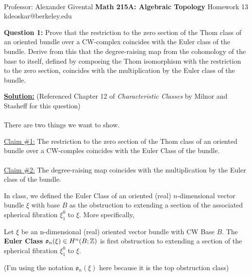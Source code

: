 \documentclass[11pt]{article}
\begin{document}
\thispagestyle{empty}
\bigskip \
\vspace{0.1cm}

\begin{center}
{\fontsize{22}{22} \selectfont Professor: Alexander Givental}
\vskip 16pt
{\fontsize{30}{30} \selectfont \bf \sffamily Math 215A: Algebraic Topology}
\vskip 24pt
{\fontsize{14}{14} \selectfont \rmfamily Homework 13} 
\vskip 6pt
{\fontsize{14}{14} \selectfont \ttfamily kdeoskar@berkeley.edu} 
\vskip 24pt
\end{center}




\begin{bluebox}
  \textbf{Question 1:} Prove that the restriction to the zero section of the Thom class of an oriented bundle over a CW-complex coincides with the Euler class of the bundle. Derive from this that the degree-raising map from the cohomology of the base to itself, defined by composing the Thom isomorphism with the restriction to the zero section, coincides with the multiplication by the Euler class of the bundle.
\end{bluebox}

\vskip 0.5cm
\textbf{\underline{Solution:}} (Referenced Chapter 12 of \textit{Characteristic Classes} by Milnor and Stasheff for this question)
\\
\\
There are two things we want to show.
\begin{dottedbox}
  \underline{Claim \#1:} The restriction to the zero section of the Thom class of an oriented bundle over a CW-comples coincides with the Euler Class of the bundle.
  \\
  \\
  \underline{Claim \#2:} The degree-raising map coincides with the multiplication by the Euler class of the bundle.
\end{dottedbox}

In class, we defined the Euler Class of an oriented (real) $n$-dimensional vector bundle $\xi$ with base $B$ as the obstruction to extending a section of the associated spherical fibration $\xi_1^0$ to $\xi$. More specifically,


\begin{definition}
  Let $\xi$ be an n-dimensional (real) oriented vector bundle with CW Base $B$. The \textbf{Euler Class} $\mathfrak{o}_n(\xi) \in H^n(B; \mathbb{Z})$ is first obstruction to extending a section of the spherical fibration $\xi_1^0$ to $\xi$.
\end{definition} (I'm using the notation $\mathfrak{o}_n(\xi)$ here because it is the top obstruction class) 
\end{document}
